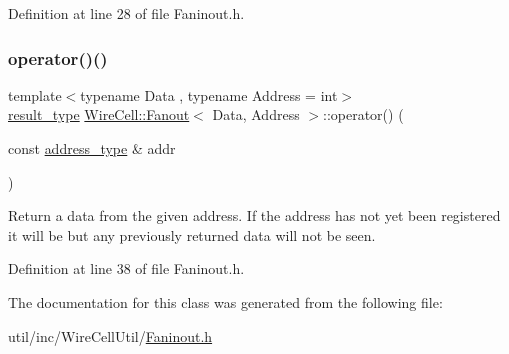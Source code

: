 Definition at line 28 of file Faninout.\+h.

\mbox{\label{class_wire_cell_1_1_fanout_a162e0d8a0d078ae641140c1e62354394}} 
\subsubsection{\texorpdfstring{operator()()}{operator()()}}
{\footnotesize\ttfamily template$<$typename Data , typename Address  = int$>$ \\
\hyperlink{class_wire_cell_1_1_fanout_ab2aa0c746557cf71d0454640c91ce0c5}{result\+\_\+type} \hyperlink{class_wire_cell_1_1_fanout}{Wire\+Cell\+::\+Fanout}$<$ Data, Address $>$\+::operator() (\begin{DoxyParamCaption}\item[{const \hyperlink{class_wire_cell_1_1_fanout_ab1b06d1a80be80055b2e76ca512294c5}{address\+\_\+type} \&}]{addr }\end{DoxyParamCaption})\hspace{0.3cm}{\ttfamily [inline]}}

Return a data from the given address. If the address has not yet been registered it will be but any previously returned data will not be seen. 

Definition at line 38 of file Faninout.\+h.



The documentation for this class was generated from the following file\+:\begin{DoxyCompactItemize}
\item 
util/inc/\+Wire\+Cell\+Util/\hyperlink{_faninout_8h}{Faninout.\+h}\end{DoxyCompactItemize}
